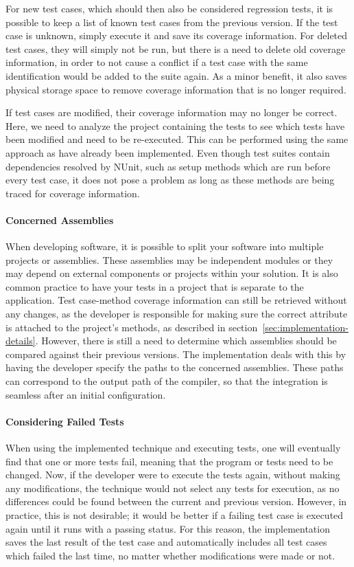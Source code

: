 \documentclass[a4paper,english,12pt]{report}
\begin{document}
For new test cases, which should then also be considered regression tests, it is possible to keep a list of known test cases from the previous version. If the test case is unknown, simply execute it and save its coverage information. For deleted test cases, they will simply not be run, but there is a need to delete old coverage information, in order to not cause a conflict if a test case with the same identification would be added to the suite again. As a minor benefit, it also saves physical storage space to remove coverage information that is no longer required.

If test cases are modified, their coverage information may no longer be correct. Here, we need to analyze the project containing the tests to see which tests have been modified and need to be re-executed. This can be performed using the same approach as have already been implemented. Even though test suites contain dependencies resolved by NUnit, such as setup methods which are run before every test case, it does not pose a problem as long as these methods are being traced for coverage information.

\paragraph{Concerned Assemblies}
When developing software, it is possible to split your software into multiple projects or assemblies. These assemblies may be independent modules or they may depend on external components or projects within your solution. It is also common practice to have your tests in a project that is separate to the application. Test case-method coverage information can still be retrieved without any changes, as the developer is responsible for making sure the correct attribute is attached to the project's methods, as described in section~\ref{sec:implementation-details}. However, there is still a need to determine which assemblies should be compared against their previous versions. The implementation deals with this by having the developer specify the paths to the concerned assemblies. These paths can correspond to the output path of the compiler, so that the integration is seamless after an initial configuration.

\paragraph{Considering Failed Tests} 
When using the implemented technique and executing tests, one will eventually find that one or more tests fail, meaning that the program or tests need to be changed. Now, if the developer were to execute the tests again, without making any modifications, the technique would not select any tests for execution, as no differences could be found between the current and previous version. However, in practice, this is not desirable; it would be better if a failing test case is executed again until it runs with a passing status. For this reason, the implementation saves the last result of the test case and automatically includes all test cases which failed the last time, no matter whether modifications were made or not.
\end{document}
